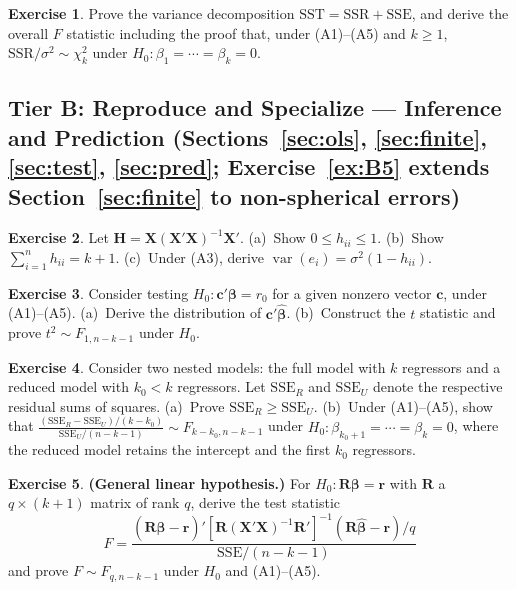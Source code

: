 \documentclass[14pt]{extarticle}
\theoremstyle{plain}
\theoremstyle{definition}
\newtheorem{exercise}{Exercise}
\newcommand{\extier}{}
\newcommand{\exercisetier}[1]{\renewcommand{\extier}{#1}\setcounter{exercise}{0}}
\theoremstyle{remark}
\DeclareMathOperator\var{var}
\newcommand{\SST}{\mathrm{SST}}
\newcommand{\SSR}{\mathrm{SSR}}
\newcommand{\SSE}{\mathrm{SSE}}
\newcommand{\bX}{\mathbf{X}}
\def\bb{\boldsymbol{\beta}}
\newcommand{\bH}{\mathbf{H}}
\newcommand{\bR}{\mathbf{R}}
\newcommand{\br}{\mathbf{r}}
\def\bc{\mathbf{c}}
\begin{document}
\begin{exercise}\label{ex:A11}
Prove the variance decomposition $\SST = \SSR + \SSE$, and derive the overall $F$ statistic including the proof that, under (A1)--(A5) and $k \geqslant 1$, $\SSR/\sigma^2 \sim \chi^2_k$ under $H_0\colon \beta_1 = \cdots = \beta_k = 0$.
\end{exercise}

\exercisetier{B}
\subsection*{Tier B: Reproduce and Specialize --- Inference and Prediction (Sections~\ref{sec:ols}, \ref{sec:finite}, \ref{sec:test}, \ref{sec:pred}; Exercise~\ref{ex:B5} extends Section~\ref{sec:finite} to non-spherical errors)}

\begin{exercise}\label{ex:B1}
Let $\bH = \bX(\bX'\bX)^{-1}\bX'$. (a)~Show $0 \leqslant h_{ii} \leqslant 1$. (b)~Show $\sum_{i=1}^n h_{ii} = k+1$. (c)~Under (A3), derive $\var(e_i) = \sigma^2(1-h_{ii})$.
\end{exercise}

\begin{exercise}\label{ex:B2}
Consider testing $H_0\colon \bc'\bb = r_0$ for a given nonzero vector $\bc$, under (A1)--(A5). (a)~Derive the distribution of $\bc'\hat{\bb}$. (b)~Construct the $t$ statistic and prove $t^2 \sim F_{1, n-k-1}$ under $H_0$.
\end{exercise}

\begin{exercise}\label{ex:B3}
Consider two nested models: the full model with $k$ regressors and a reduced model with $k_0 < k$ regressors. Let $\SSE_R$ and $\SSE_U$ denote the respective residual sums of squares. (a)~Prove $\SSE_R \geqslant \SSE_U$. (b)~Under (A1)--(A5), show that $\frac{(\SSE_R - \SSE_U)/(k-k_0)}{\SSE_U/(n-k-1)} \sim F_{k-k_0, n-k-1}$ under $H_0\colon \beta_{k_0+1} = \cdots = \beta_k = 0$, where the reduced model retains the intercept and the first $k_0$ regressors.
\end{exercise}

\begin{exercise}\label{ex:B4}
\textbf{(General linear hypothesis.)} For $H_0\colon \bR\bb = \br$ with $\bR$ a $q\times(k+1)$ matrix of rank $q$, derive the test statistic
\[
F = \frac{(\bR\hat{\bb} - \br)'[\bR(\bX'\bX)^{-1}\bR']^{-1}(\bR\hat{\bb} - \br)/q}{\SSE/(n-k-1)}
\]
and prove $F \sim F_{q, n-k-1}$ under $H_0$ and (A1)--(A5).
\end{exercise}
\end{document}
